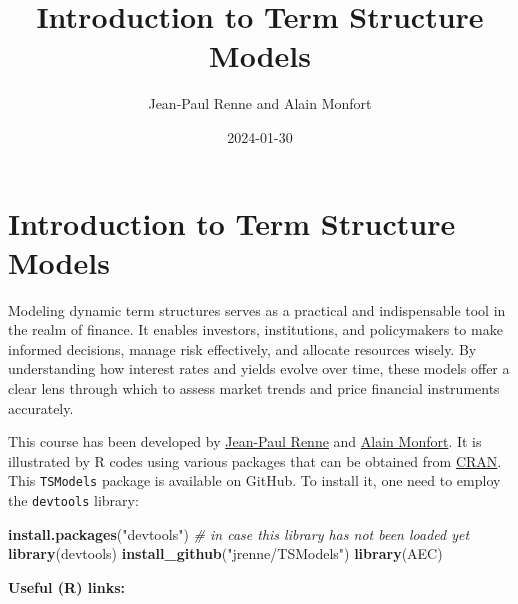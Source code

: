 \documentclass[
  12pt,
]{book}
\title{Introduction to Term Structure Models}
\author{Jean-Paul Renne and Alain Monfort}
\date{2024-01-30}
\newenvironment{Shaded}{\begin{snugshade}}{\end{snugshade}}
\newcommand{\CommentTok}[1]{\textcolor[rgb]{0.56,0.35,0.01}{\textit{#1}}}
\newcommand{\FunctionTok}[1]{\textcolor[rgb]{0.13,0.29,0.53}{\textbf{#1}}}
\newcommand{\NormalTok}[1]{#1}
\newcommand{\StringTok}[1]{\textcolor[rgb]{0.31,0.60,0.02}{#1}}
\theoremstyle{definition}
\theoremstyle{definition}
\theoremstyle{definition}
\theoremstyle{definition}
\theoremstyle{remark}
\begin{document}
\maketitle

{
\setcounter{tocdepth}{1}
\tableofcontents
}
\newcommand{\bv}[1]{\mathbf{#1}}

\hypertarget{intro}{%
\chapter*{Introduction to Term Structure Models}\label{intro}}

Modeling dynamic term structures serves as a practical and indispensable tool in the realm of finance. It enables investors, institutions, and policymakers to make informed decisions, manage risk effectively, and allocate resources wisely. By understanding how interest rates and yields evolve over time, these models offer a clear lens through which to assess market trends and price financial instruments accurately.

This course has been developed by \href{https://sites.google.com/site/jeanpaulrenne/home}{Jean-Paul Renne} and \href{https://faculty.crest.fr/amonfort/}{Alain Monfort}. It is illustrated by R codes using various packages that can be obtained from \href{https://cran.r-project.org}{CRAN}. This \texttt{TSModels} package is available on GitHub. To install it, one need to employ the \texttt{devtools} library:

\begin{Shaded}
\begin{Highlighting}[]
\FunctionTok{install.packages}\NormalTok{(}\StringTok{"devtools"}\NormalTok{) }\CommentTok{\# in case this library has not been loaded yet}
\FunctionTok{library}\NormalTok{(devtools)}
\FunctionTok{install\_github}\NormalTok{(}\StringTok{"jrenne/TSModels"}\NormalTok{)}
\FunctionTok{library}\NormalTok{(AEC)}
\end{Highlighting}
\end{Shaded}

\textbf{Useful (R) links:}
\end{document}
